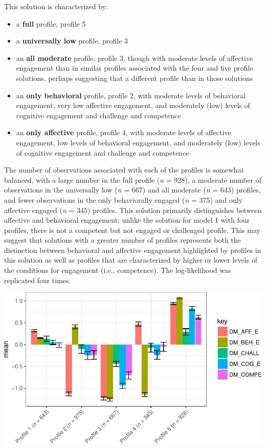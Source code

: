 \documentclass[]{book}
\providecommand{\tightlist}{%
  \setlength{\itemsep}{0pt}\setlength{\parskip}{0pt}}
\theoremstyle{definition}
\theoremstyle{definition}
\theoremstyle{definition}
\theoremstyle{remark}
\begin{document}
This solution is characterized by:

\begin{itemize}
\tightlist
\item
  a \textbf{full} profile, profile 5
\item
  a \textbf{universally low} profile, profile 3
\item
  an \textbf{all moderate} profile, profile 3, though with moderate
  levels of affective engagement than in similar profiles associated
  with the four and five profile solutions, perhaps suggesting that a
  different profile than in those solutions
\item
  an \textbf{only behavioral} profile, profile 2, with moderate levels
  of behavioral engagement, very low affective engagement, and
  moderately (low) levels of cognitive engagement and challenge and
  competence
\item
  an \textbf{only affective} profile, profile 4, with moderate levels of
  affective engagement, low levels of behavioral engagement, and
  moderately (low) levels of cognitive engagement and challenge and
  competence
\end{itemize}

The number of observations associated with each of the profiles is
somewhat balanced, with a large number in the full profile (\emph{n} =
928), a moderate number of observations in the universally low (\emph{n}
= 667) and all moderate (\emph{n} = 643) profiles, and fewer
observations in the only behaviorally engaged (\emph{n} = 375) and only
affective engaged (\emph{n} = 345) profiles. This solution primarily
distinguishes between affective and behavioral engagement; unlike the
solution for model 1 with four profiles, there is not a competent but
not engaged or challenged profile. This may suggest that solutions with
a greater number of profiles represents both the distinction between
behavioral and affective engagement highlighted by profiles in this
solution as well as profiles that are characterized by higher or lower
levels of the conditions for engagement (i.e., competence). The
log-likelihood was replicated four times.

\begin{center}\includegraphics[width=0.8\linewidth]{rosenberg-dissertation_files/figure-latex/m1_5p-1} \end{center}
\end{document}
